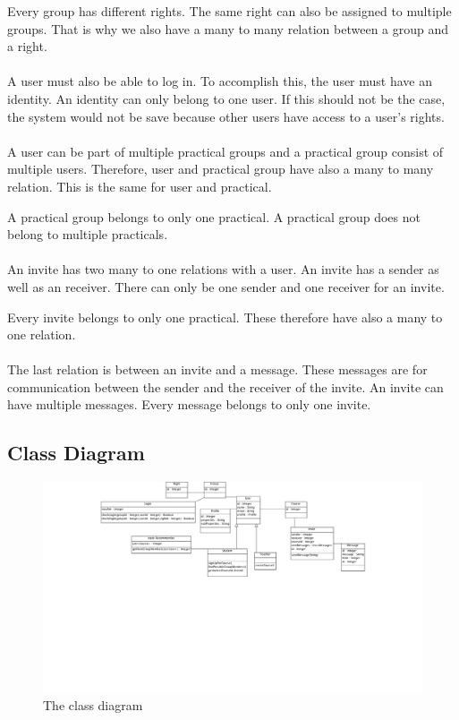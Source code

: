 Every group has different rights.
The same right can also be assigned to multiple groups.
That is why we also have a many to many relation between a group and a right.
\\\\
A user must also be able to log in.
To accomplish this, the user must have an identity.
An identity can only belong to one user.
If this should not be the case, the system would not be save because other users have access to a user's rights.
\\\\
A user can be part of multiple practical groups and a practical group consist of multiple users.
Therefore, user and practical group have also a many to many relation.
This is the same for user and practical.

A practical group belongs to only one practical.
A practical group does not belong to multiple practicals.
\\\\
An invite has two many to one relations with a user.
An invite has a sender as well as an receiver.
There can only be one sender and one receiver for an invite.

Every invite belongs to only one practical.
These therefore have also a many to one relation.
\\\\
The last relation is between an invite and a message.
These messages are for communication between the sender and the receiver of the invite.
An invite can have multiple messages.
Every message belongs to only one invite.

\subsection{Class Diagram}

\begin{figure}[h]
    \centering
    \captionsetup{justification=centering}
    \includegraphics[width=\textwidth, frame]{images/class_diagram}
    \caption{The class diagram}
    \label{class_diagram}
\end{figure}

